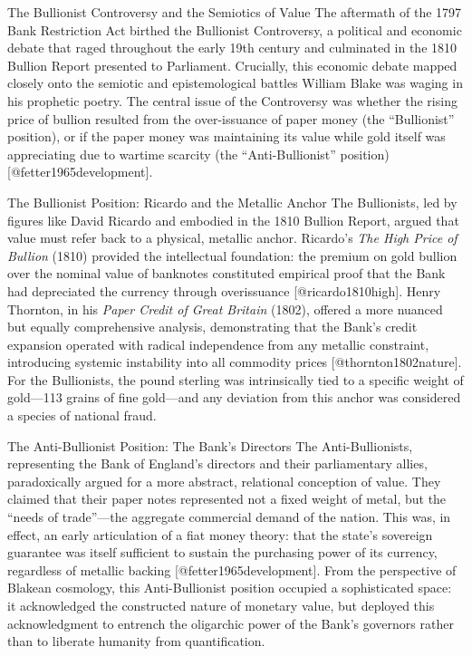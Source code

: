 \documentclass[
  ignorenonframetext,
]{beamer}
\author{\texorpdfstring{}{}}
\date{}
\begin{document}
\begin{frame}{The Bullionist Controversy and the Semiotics of Value}
\protect{}\label{the-bullionist-controversy-and-the-semiotics-of-value}
The aftermath of the 1797 Bank Restriction Act birthed the Bullionist
Controversy, a political and economic debate that raged throughout the
early 19th century and culminated in the 1810 Bullion Report presented
to Parliament. Crucially, this economic debate mapped closely onto the
semiotic and epistemological battles William Blake was waging in his
prophetic poetry. The central issue of the Controversy was whether the
rising price of bullion resulted from the over-issuance of paper money
(the ``Bullionist'' position), or if the paper money was maintaining its
value while gold itself was appreciating due to wartime scarcity (the
``Anti-Bullionist'' position) {[}@fetter1965development{]}.

\begin{block}{The Bullionist Position: Ricardo and the Metallic Anchor}
\protect{}\label{the-bullionist-position-ricardo-and-the-metallic-anchor}
The Bullionists, led by figures like David Ricardo and embodied in the
1810 Bullion Report, argued that value must refer back to a physical,
metallic anchor. Ricardo's \emph{The High Price of Bullion} (1810)
provided the intellectual foundation: the premium on gold bullion over
the nominal value of banknotes constituted empirical proof that the Bank
had depreciated the currency through overissuance
{[}@ricardo1810high{]}. Henry Thornton, in his \emph{Paper Credit of
Great Britain} (1802), offered a more nuanced but equally comprehensive
analysis, demonstrating that the Bank's credit expansion operated with
radical independence from any metallic constraint, introducing systemic
instability into all commodity prices {[}@thornton1802nature{]}. For the
Bullionists, the pound sterling was intrinsically tied to a specific
weight of gold---113 grains of fine gold---and any deviation from this
anchor was considered a species of national fraud.
\end{block}

\begin{block}{The Anti-Bullionist Position: The Bank's Directors}
\protect{}\label{the-anti-bullionist-position-the-banks-directors}
The Anti-Bullionists, representing the Bank of England's directors and
their parliamentary allies, paradoxically argued for a more abstract,
relational conception of value. They claimed that their paper notes
represented not a fixed weight of metal, but the ``needs of
trade''---the aggregate commercial demand of the nation. This was, in
effect, an early articulation of a fiat money theory: that the state's
sovereign guarantee was itself sufficient to sustain the purchasing
power of its currency, regardless of metallic backing
{[}@fetter1965development{]}. From the perspective of Blakean cosmology,
this Anti-Bullionist position occupied a sophisticated space: it
acknowledged the constructed nature of monetary value, but deployed this
acknowledgment to entrench the oligarchic power of the Bank's governors
rather than to liberate humanity from quantification.
\end{block}


\end{frame}
\end{document}
